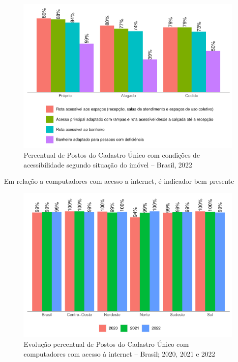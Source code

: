 \documentclass[
  brazilian]{report}
\begin{document}
\begin{figure}
\includegraphics{Censo-SUAS-2022_files/figure-latex/postcad-acessibilidade-situacao-1} \caption[Percentual de Postos do Cadastro Único com condições de acessibilidade segundo situação do imóvel – Brasil, 2022]{Percentual de Postos do Cadastro Único com condições de acessibilidade segundo situação do imóvel – Brasil, 2022}\label{fig:postcad-acessibilidade-situacao}
\end{figure}

Em relação a computadores com acesso a internet, é indicador bem
presente

\begin{figure}
\includegraphics{Censo-SUAS-2022_files/figure-latex/postcad-internet-percentual-1} \caption[Evolução percentual de Postos do Cadastro Único com computadores com acesso à internet – Brasil]{Evolução percentual de Postos do Cadastro Único com computadores com acesso à internet – Brasil;  2020, 2021 e 2022}\label{fig:postcad-internet-percentual}
\end{figure}
\end{document}
